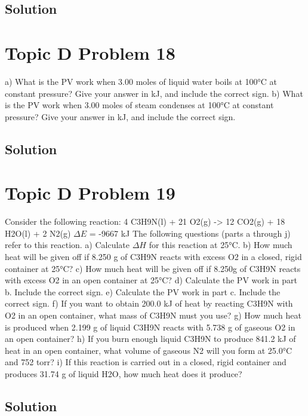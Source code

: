 \documentclass[10pt]{article}
\begin{document}
        \subsection{Solution}

    \pagebreak
    \section{Topic D Problem 18}
        a) What is the PV work when 3.00 moles of liquid water boils at 100\unit{\celsius} at constant pressure?
Give your answer in kJ, and include the correct sign.
b) What is the PV work when 3.00 moles of steam condenses at 100\unit{\celsius} at constant pressure?
Give your answer in kJ, and include the correct sign.

        
        \subsection{Solution}

    \pagebreak
    \section{Topic D Problem 19}
        Consider the following reaction:
4 C3H9N(l) + 21 O2(g) -> 12 CO2(g) + 18 H2O(l) + 2 N2(g) $\Delta E$ = -9667 kJ
The following questions (parts a through j) refer to this reaction.
a) Calculate $\Delta H$ for this reaction at 25\unit{\celsius}.
b) How much heat will be given off if 8.250 g of C3H9N reacts with excess O2 in a closed,
rigid container at 25\unit{\celsius}?
c) How much heat will be given off if 8.250g of C3H9N reacts with excess O2 in an open
container at 25\unit{\celsius}?
d) Calculate the PV work in part b. Include the correct sign.
e) Calculate the PV work in part c. Include the correct sign.
f) If you want to obtain 200.0 kJ of heat by reacting C3H9N with O2 in an open container,
what mass of C3H9N must you use?
g) How much heat is produced when 2.199 g of liquid C3H9N reacts with 5.738 g of gaseous
O2 in an open container?
h) If you burn enough liquid C3H9N to produce 841.2 kJ of heat in an open container, what
volume of gaseous N2 will you form at 25.0\unit{\celsius} and 752 torr?
i) If this reaction is carried out in a closed, rigid container and produces 31.74 g of liquid
H2O, how much heat does it produce?
        
        \subsection{Solution}
\end{document}
